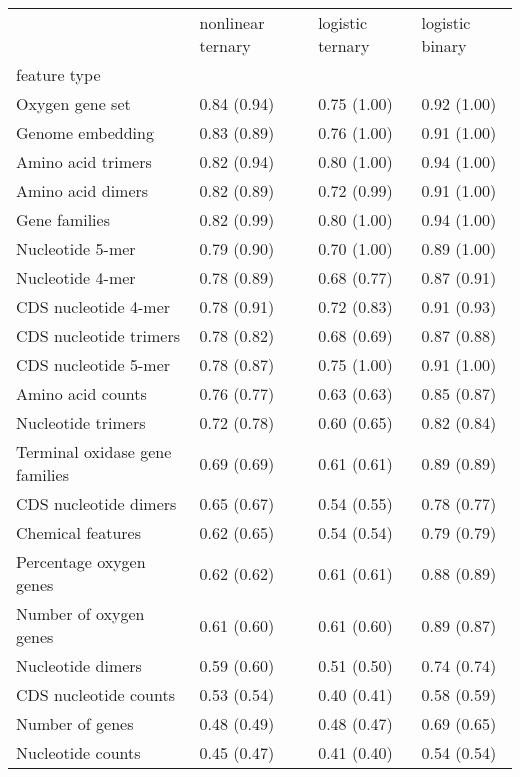 \begin{tabular}{llll}
\toprule
 & nonlinear ternary & logistic ternary & logistic binary \\
feature type &  &  &  \\
\midrule
Oxygen gene set & 0.84 (0.94) & 0.75 (1.00) & 0.92 (1.00) \\
Genome embedding & 0.83 (0.89) & 0.76 (1.00) & 0.91 (1.00) \\
Amino acid trimers & 0.82 (0.94) & 0.80 (1.00) & 0.94 (1.00) \\
Amino acid dimers & 0.82 (0.89) & 0.72 (0.99) & 0.91 (1.00) \\
Gene families & 0.82 (0.99) & 0.80 (1.00) & 0.94 (1.00) \\
Nucleotide 5-mer & 0.79 (0.90) & 0.70 (1.00) & 0.89 (1.00) \\
Nucleotide 4-mer & 0.78 (0.89) & 0.68 (0.77) & 0.87 (0.91) \\
CDS nucleotide 4-mer & 0.78 (0.91) & 0.72 (0.83) & 0.91 (0.93) \\
CDS nucleotide trimers & 0.78 (0.82) & 0.68 (0.69) & 0.87 (0.88) \\
CDS nucleotide 5-mer & 0.78 (0.87) & 0.75 (1.00) & 0.91 (1.00) \\
Amino acid counts & 0.76 (0.77) & 0.63 (0.63) & 0.85 (0.87) \\
Nucleotide trimers & 0.72 (0.78) & 0.60 (0.65) & 0.82 (0.84) \\
Terminal oxidase gene families & 0.69 (0.69) & 0.61 (0.61) & 0.89 (0.89) \\
CDS nucleotide dimers & 0.65 (0.67) & 0.54 (0.55) & 0.78 (0.77) \\
Chemical features & 0.62 (0.65) & 0.54 (0.54) & 0.79 (0.79) \\
Percentage oxygen genes & 0.62 (0.62) & 0.61 (0.61) & 0.88 (0.89) \\
Number of oxygen genes & 0.61 (0.60) & 0.61 (0.60) & 0.89 (0.87) \\
Nucleotide dimers & 0.59 (0.60) & 0.51 (0.50) & 0.74 (0.74) \\
CDS nucleotide counts & 0.53 (0.54) & 0.40 (0.41) & 0.58 (0.59) \\
Number of genes & 0.48 (0.49) & 0.48 (0.47) & 0.69 (0.65) \\
Nucleotide counts & 0.45 (0.47) & 0.41 (0.40) & 0.54 (0.54) \\
\bottomrule
\end{tabular}
